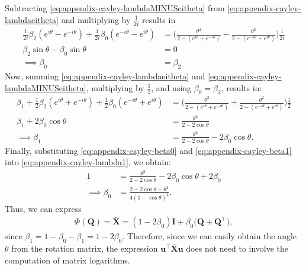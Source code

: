 Subtracting \eqref{eq:appendix-cayley-lambdaMINUSeitheta} from \eqref{eq:appendix-cayley-lambdaeitheta} and multiplying by $\frac{1}{2i}$ results in
\begin{align}
    \frac{1}{2i}\beta_2(e^{i\theta}-e^{-i\theta}) +\frac{1}{2i}\beta_0(e^{-i\theta}-e^{i\theta}) &= \biggl(\frac{\theta^2}{2 - (e^{i\theta}+ e^{-i\theta})} - \frac{\theta^2}{2 - (e^{-i\theta}+ e^{i\theta})}\biggr)\frac{1}{2i}\\
    \beta_2\sin\theta -\beta_0\sin\theta &= 0\\
    \implies \beta_0&=\beta_2 \label{eq:appendix-cayley-beta0}
\end{align}
Now, summing \eqref{eq:appendix-cayley-lambdaeitheta} and \eqref{eq:appendix-cayley-lambdaMINUSeitheta}, multiplying by $\frac{1}{2}$, and using $\beta_0=\beta_2$, results in:
\begin{align}
    \beta_1+\frac{1}{2}\beta_2(e^{i\theta}+e^{-i\theta}) +\frac{1}{2}\beta_0(e^{-i\theta}+e^{i\theta}) &= \biggl(\frac{\theta^2}{2 - (e^{i\theta}+ e^{-i\theta})} + \frac{\theta^2}{2 - (e^{-i\theta}+ e^{i\theta})}\biggr)\frac{1}{2}\\
    \beta_1+2\beta_0\cos\theta  &= \frac{\theta^2}{2 - 2\cos\theta}\\
    \implies \beta_1&=\frac{\theta^2}{2 - 2\cos\theta} - 2\beta_0\cos\theta. \label{eq:appendix-cayley-beta1}
\end{align}
Finally, substituting \eqref{eq:appendix-cayley-beta0} and \eqref{eq:appendix-cayley-beta1} into \eqref{eq:appendix-cayley-lambda1}, we obtain:
\begin{align}
    1 &= \frac{\theta^2}{2 - 2\cos\theta} - 2\beta_0\cos\theta + 2\beta_0 \\
    \implies \beta_0 &= \frac{2-2\cos\theta-\theta^2}{4(1 - \cos\theta)^2}. 
\end{align}
Thus, we can express
\begin{align}
    \Phi(\mathbf{Q}) = \bar{\mathbf{X}} = (1-2\beta_0)\mathbf{I} + \beta_0\bigl(\mathbf{Q} + \mathbf{Q}^\top\bigr), \label{eq:appendix-explicit-X-bar-eedist}
\end{align}
since $\beta_1=1-\beta_0-\beta_1=1-2\beta_0$. Therefore, since we can easily obtain the angle $\theta$ from the rotation matrix, the expression $\mathbf{u}^\top\bar{\mathbf{X}}\mathbf{u}$ does not need to involve the computation of matrix logarithms.

